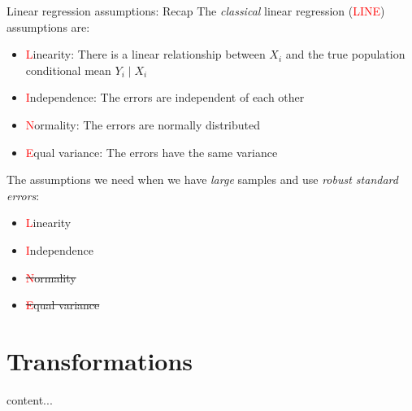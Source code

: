 \documentclass[10pt,t]{beamer}
\begin{document}
\begin{frame}{Linear regression assumptions: Recap}
The \textit{classical} linear regression (\textcolor{red}{LINE}) assumptions are:

\vspace{0.3cm}

\begin{itemize}
	\item \textcolor{red}{L}inearity: There is a linear relationship between $X_i$ and the true population conditional mean $Y_i \mid X_i$
	\item \textcolor{red}{I}ndependence: The errors are independent of each other
	\item \textcolor{red}{N}ormality: The errors are normally distributed
	\item \textcolor{red}{E}qual variance: The errors have the same variance
\end{itemize}

\vspace{0.3cm}

The assumptions we need when we have \textit{large} samples and use \textit{robust standard errors}:

\vspace{0.3cm}

\begin{itemize}
	\item \textcolor{red}{L}inearity
	\item \textcolor{red}{I}ndependence
	\item \sout{\textcolor{red}{N}ormality}
	\item \sout{\textcolor{red}{E}qual variance}
\end{itemize}

\end{frame}


\section{Transformations}

\begin{frame}{}
content...
\end{frame}
\end{document}
